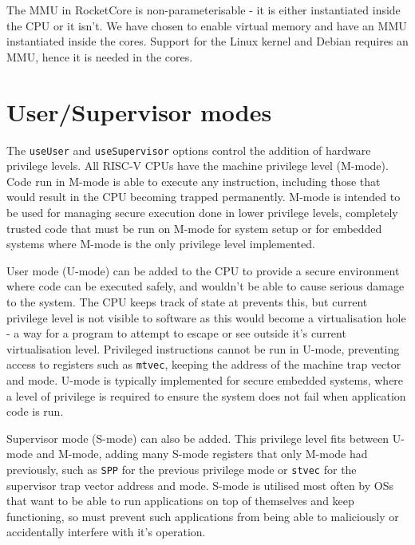 The MMU in RocketCore is non-parameterisable - it is either instantiated inside the CPU or it isn't. We have chosen to enable virtual memory and have an MMU instantiated inside the cores. Support for the Linux kernel and Debian requires an MMU, hence it is needed in the cores. %

\section{User/Supervisor modes}
The \texttt{useUser} and \texttt{useSupervisor} options control the addition of hardware privilege levels. All RISC-V CPUs have the machine privilege level (M-mode). Code run in M-mode is able to execute any instruction, including those that would result in the CPU becoming trapped permanently. M-mode is intended to be used for managing secure execution done in lower privilege levels, completely trusted code that must be run on M-mode for system setup or for embedded systems where M-mode is the only privilege level implemented.

User mode (U-mode) can be added to the CPU to provide a secure environment where code can be executed safely, and wouldn't be able to cause serious damage to the system. The CPU keeps track of state at prevents this, but current privilege level is not visible to software as this would become a virtualisation hole - a way for a program to attempt to escape or see outside it's current virtualisation level. Privileged instructions cannot be run in U-mode, preventing access to registers such as \texttt{mtvec}, keeping the address of the machine trap vector and mode. U-mode is typically implemented for secure embedded systems, where a level of privilege is required to ensure the system does not fail when application code is run.

Supervisor mode (S-mode) can also be added. This privilege level fits between U-mode and M-mode, adding many S-mode registers that only M-mode had previously, such as \texttt{SPP} for the previous privilege mode or \texttt{stvec} for the supervisor trap vector address and mode. S-mode is utilised most often by OSs that want to be able to run applications on top of themselves and keep functioning, so must prevent such applications from being able to maliciously or accidentally interfere with it's operation.

